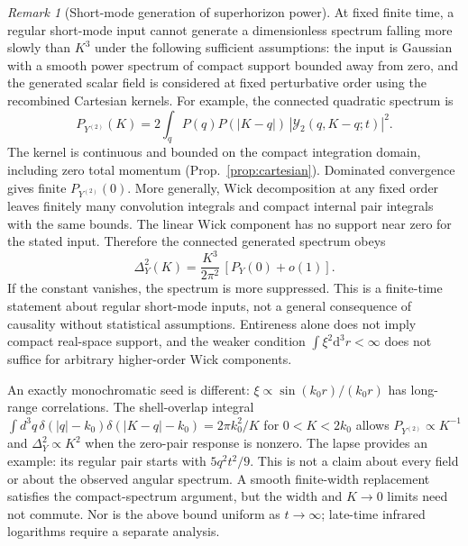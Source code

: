 \documentclass[11pt]{article}
\theoremstyle{definition}
\theoremstyle{remark}
\newtheorem{remark}[theorem]{Remark}
\newcommand{\dd}{\mathrm{d}}
\begin{document}
\begin{remark}[Short-mode generation of superhorizon power]\label{rem:k3}
At fixed finite time, a regular short-mode input cannot generate a dimensionless spectrum
falling more slowly than $K^3$ under the following sufficient assumptions: the input is Gaussian
with a smooth power spectrum of compact support bounded away from zero, and the generated scalar
field is considered at fixed perturbative order using the recombined Cartesian kernels.
For example, the connected quadratic spectrum is
\[
 P_{Y^{(2)}}(K)=2\int_q P(q)P(|K-q|)\,
 |\mathcal Y_2(q,K-q;t)|^2.
\]
The kernel is continuous and bounded on the compact integration domain, including zero total
momentum (Prop.~\ref{prop:cartesian}). Dominated convergence gives finite $P_{Y^{(2)}}(0)$.
More generally, Wick decomposition at any fixed order leaves finitely many convolution
integrals and compact internal pair integrals with the same bounds. The linear Wick component
has no support near zero for the stated input. Therefore the connected generated spectrum obeys
\[
 \Delta_Y^2(K)=\frac{K^3}{2\pi^2}\,[P_Y(0)+o(1)].
\]
If the constant vanishes, the spectrum is more suppressed. This is a finite-time statement
about regular short-mode inputs, not a general consequence of causality without statistical
assumptions. Entireness alone does not imply compact real-space support, and the weaker
condition $\int\xi^2\dd^3r<\infty$ does not suffice for arbitrary higher-order Wick components.

An exactly monochromatic seed is different: $\xi\propto\sin(k_0r)/(k_0r)$ has long-range
correlations. The shell-overlap integral
$\int d^3q\,\delta(|q|-k_0)\delta(|K-q|-k_0)=2\pi k_0^2/K$ for $0<K<2k_0$
allows $P_{Y^{(2)}}\propto K^{-1}$ and $\Delta_Y^2\propto K^2$ when the zero-pair response is
nonzero. The lapse provides an example: its regular pair starts with $5q^2t^2/9$.
This is not a claim about every field or about the observed angular spectrum. A smooth
finite-width replacement satisfies the compact-spectrum argument, but the width and
$K\to0$ limits need not commute. Nor is the above bound uniform as $t\to\infty$; late-time
infrared logarithms require a separate analysis.
\end{remark}
\end{document}
